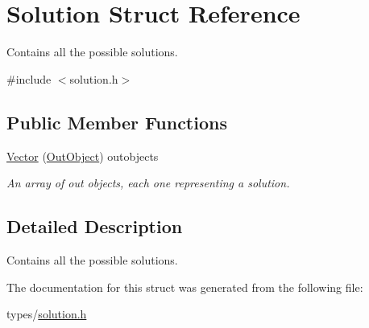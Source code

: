 \hypertarget{struct_solution}{}\section{Solution Struct Reference}
\label{struct_solution}


Contains all the possible solutions.  




{\ttfamily \#include $<$solution.\+h$>$}

\subsection*{Public Member Functions}
\begin{DoxyCompactItemize}
\item 
\hyperlink{struct_solution_aef0703f1707a942b2eb42c09013cda94}{Vector} (\hyperlink{struct_out_object}{Out\+Object}) outobjects\hypertarget{struct_solution_aef0703f1707a942b2eb42c09013cda94}{}\label{struct_solution_aef0703f1707a942b2eb42c09013cda94}

\begin{DoxyCompactList}\small\item\em An array of out objects, each one representing a solution. \end{DoxyCompactList}\end{DoxyCompactItemize}


\subsection{Detailed Description}
Contains all the possible solutions. 

The documentation for this struct was generated from the following file\+:\begin{DoxyCompactItemize}
\item 
types/\hyperlink{solution_8h}{solution.\+h}\end{DoxyCompactItemize}
